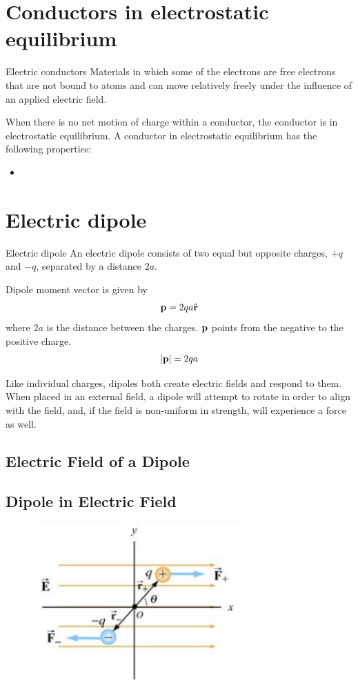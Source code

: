 \section{Conductors in electrostatic equilibrium}
\begin{defn}{Electric conductors}{}
Materials in which some of the electrons are free electrons that are not bound to atoms and can move relatively freely under the influence of an applied electric field.
\end{defn}

When there is no net motion of charge within a conductor, the conductor is in electrostatic equilibrium. A conductor in electrostatic equilibrium has the following properties:

\begin{itemize}
\item 
\end{itemize}

\section{Electric dipole}
\begin{defn}{Electric dipole}{}
An electric dipole consists of two equal but opposite charges, $+q$ and $-q$, separated by a distance $2a$.
\end{defn}

Dipole moment vector is given by 
\begin{equation}
{\vb{p} = 2qa\hat{\vb{r}}
}\end{equation}
where $2a$ is the distance between the charges. $\vb{p}$ points from the negative to the positive charge.
\[ |\vb{p}| = 2qa \]

Like individual charges, dipoles both create electric fields and respond to them. When placed in an external field, a dipole will attempt to rotate in order to align with the field, and, if the field is non-uniform in strength, will experience a force as well. 

\subsection{Electric Field of a Dipole}

\subsection{Dipole in Electric Field}
\begin{figure}[H]
    \centering
    \includegraphics[width=8cm]{images/dipole_in_e_field.jpg}
\end{figure}

